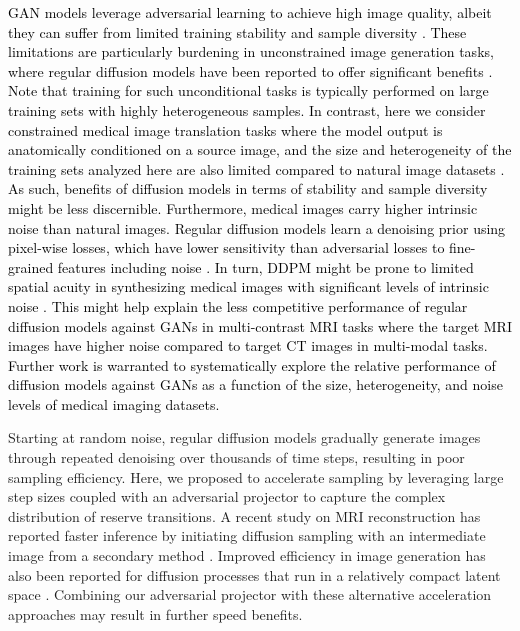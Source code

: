 \documentclass[journal,twoside,web]{ieeecolor}
\newcommand*{\revhl}{\textcolor{black}}
\begin{document}
\revhl{GAN models leverage adversarial learning to achieve high image quality, albeit they can suffer from limited training stability and sample diversity \cite{goodfellow2014generative}. These limitations are particularly burdening in unconstrained image generation tasks, where regular diffusion models have been reported to offer significant benefits \cite{DDPM,nichol2021improved}. Note that training for such unconditional tasks is typically performed on large training sets with highly heterogeneous samples. In contrast, here we consider constrained medical image translation tasks where the model output is anatomically conditioned on a source image, and the size and heterogeneity of the training sets analyzed here are also limited compared to natural image datasets \cite{armanious2019,dar2019image}. As such, benefits of diffusion models in terms of stability and sample diversity might be less discernible. Furthermore, medical images carry higher intrinsic noise than natural images. Regular diffusion models learn a denoising prior using pixel-wise losses, which have lower sensitivity than adversarial losses to fine-grained features including noise \cite{dar2019image}. In turn, DDPM might be prone to limited spatial acuity in synthesizing medical images with significant levels of intrinsic noise \cite{DDM}. This might help explain the less competitive performance of regular diffusion models against GANs in multi-contrast MRI tasks where the target MRI images have higher noise compared to target CT images in multi-modal tasks. Further work is warranted to systematically explore the relative performance of diffusion models against GANs as a function of the size, heterogeneity, and noise levels of medical imaging datasets.}

Starting at random noise, regular diffusion models gradually generate images through repeated denoising over thousands of time steps, resulting in poor sampling efficiency. Here, we proposed to accelerate sampling by leveraging large step sizes coupled with an adversarial projector to capture the complex distribution of reserve transitions. A recent study on MRI reconstruction has reported faster inference by initiating diffusion sampling with an intermediate image from a secondary method \cite{chung2022cvpr}. Improved efficiency in image generation has also been reported for diffusion processes that run in a relatively compact latent space \cite{CardosoLatentDiffusion}. Combining our adversarial projector with these alternative acceleration approaches may result in further speed benefits.
\end{document}
